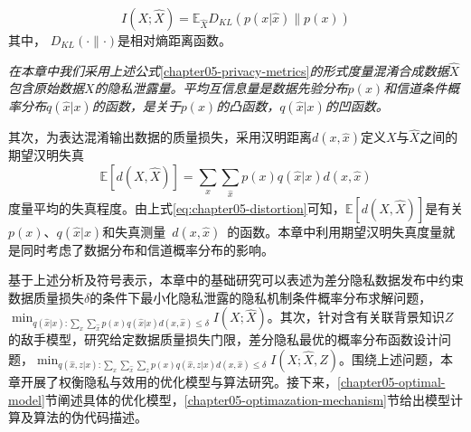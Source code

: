 \begin{equation}\label{chapter05-privacy-metrics}
	I(X;\hat{X})=\mathbb{E}_{\hat{X}}D_{KL}\left(p(x|\hat{x})\parallel p(x)\right)
\end{equation}
其中， $D_{KL}(\cdot \parallel \cdot)$是相对熵距离函数。

\begin{remark}{\em
在本章中我们采用上述公式}\ref{chapter05-privacy-metrics}{\em 的形式度量混淆合成数据$\hat{X}$包含原始数据$X$的隐私泄露量。平均互信息量是数据先验分布$p(x)$和信道条件概率分布$q(\hat{x}|x)$的函数，是关于$p(x)$的凸函数，$q(\hat{x}|x)$的凹函数。}
\end{remark}

其次，为表达混淆输出数据的质量损失，采用汉明距离$d(x,\hat{x})$定义$X$与$\hat{X}$之间的期望汉明失真
\begin{equation}\label{eq:chapter05-distortion}
	\mathbb{E}\left[d\left(X,\hat{X}\right)\right]=\sum_{x}\sum_{\hat{x}}p(x)q(\hat{x}|x)d(x,\hat{x})
\end{equation}
度量平均的失真程度。由上式\ref{eq:chapter05-distortion}可知，$	\mathbb{E}\left[d\left(X,\hat{X}\right)\right]$是有关$p(x)$、$q(\hat{x}|x)$和失真测量~$d(x,\hat{x})$~的函数。本章中利用期望汉明失真度量就是同时考虑了数据分布和信道概率分布的影响。

基于上述分析及符号表示，本章中的基础研究可以表述为差分隐私数据发布中约束数据质量损失$\delta$的条件下最小化隐私泄露的隐私机制条件概率分布求解问题，$\min_{q(\hat{x}|x):\sum_{x}\sum_{\hat{x}}p(x)q(\hat{x}|x)d(x,\hat{x})\leq \delta}I(X;\hat{X})$。其次，针对含有关联背景知识$Z$的敌手模型，研究给定数据质量损失门限，差分隐私最优的概率分布函数设计问题，$\min_{q(\hat{x},z|x):\sum_{x}\sum_{\hat{x}}\sum_{z}p(x)q(\hat{x},z|x)d(x,\hat{x})\leq  \delta}I(X;\hat{X},Z)$。围绕上述问题，本章开展了权衡隐私与效用的优化模型与算法研究。接下来，\ref{chapter05-optimal-model}节阐述具体的优化模型，\ref{chapter05-optimazation-mechanism}节给出模型计算及算法的伪代码描述。

